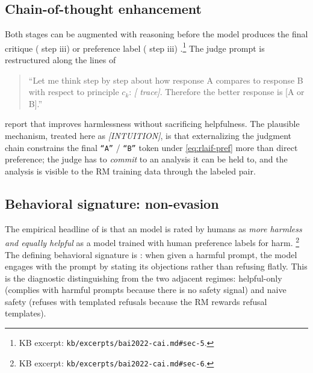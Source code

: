 \subsection{Chain-of-thought enhancement}
\label{sec:rlaif-cot}

Both stages can be augmented with  reasoning before
the model produces the final critique ( step iii) or preference
label ( step iii)
\citep[\S 5]{bai2022-cai}.\footnote{KB excerpt:
\nolinkurl{kb/excerpts/bai2022-cai.md#sec-5}.} The judge prompt is
restructured along the lines of
\begin{quote}
\small
``Let me think step by step about how response A compares to response
B with respect to principle $c_k$: \emph{[ trace]}. Therefore the
better response is [A or B].''
\end{quote}
\citet[\S 5]{bai2022-cai} report that  improves harmlessness without
sacrificing helpfulness. The plausible mechanism, treated here as
\textit{[INTUITION]}, is that externalizing the judgment chain
constrains the final \texttt{``A''} / \texttt{``B''} token under
\cref{eq:rlaif-pref} more than direct preference; the judge has to
\emph{commit} to an analysis it can be held to, and the analysis is
visible to the RM training data through the labeled pair.

\subsection{Behavioral signature: non-evasion}
\label{sec:rlaif-behavioral}

The empirical headline of \citet[\S 6]{bai2022-cai} is that an 
model is rated by humans as \emph{more harmless and equally helpful}
as a model trained with human preference labels for harm.%
\footnote{KB excerpt: \nolinkurl{kb/excerpts/bai2022-cai.md#sec-6}.} The
defining behavioral signature is \emph{}: when given a
harmful prompt, the model engages with the prompt by stating its
objections rather than refusing flatly. This is the diagnostic
distinguishing  from the two adjacent regimes: helpful-only 
(complies with harmful prompts because there is no safety signal) and
naive safety  (refuses with templated refusals because the RM
rewards refusal templates).

